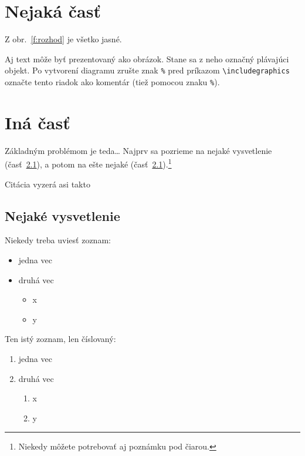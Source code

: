 \documentclass[10pt,twoside,slovak,a4paper]{article}
\begin{document}
\section{Nejaká časť}\label{nejaka}

Z obr.~\ref{f:rozhod} je všetko jasné. 

\begin{figure*}[tbh]
\centering
Aj text môže byť prezentovaný ako obrázok. Stane sa z neho označný plávajúci objekt. Po vytvorení diagramu zrušte znak \texttt{\%} pred príkazom \verb|\includegraphics| označte tento riadok ako komentár (tiež pomocou znaku \texttt{\%}).
\caption{Rozhodujúci argument.}\label{f:rozhod}
\end{figure*}

\section{Iná časť}\label{ina}

Základným problémom je teda\ldots{} Najprv sa pozrieme na nejaké vysvetlenie (časť~\ref{ina:nejake}), a potom na ešte nejaké (časť~\ref{ina:nejake}).\footnote{Niekedy môžete potrebovať aj poznámku pod čiarou.}

Citácia vyzerá asi takto~\cite{Bicalho2020}
\subsection{Nejaké vysvetlenie}\label{ina:nejake}

Niekedy treba uviesť zoznam:

\begin{itemize}
\item jedna vec
\item druhá vec
	\begin{itemize}
	\item x
	\item y
	\end{itemize}
\end{itemize}

Ten istý zoznam, len číslovaný:

\begin{enumerate}
\item jedna vec
\item druhá vec
	\begin{enumerate}
	\item x
	\item y
	\end{enumerate}
\end{enumerate}
\end{document}
